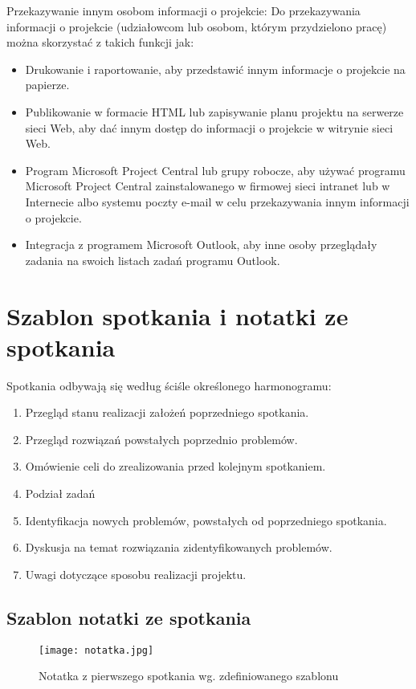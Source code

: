 \clearpage

Przekazywanie innym osobom informacji o projekcie:
 Do przekazywania informacji o projekcie (udziałowcom lub osobom, którym przydzielono pracę) można skorzystać z takich funkcji jak:
\begin{itemize}
\item Drukowanie i raportowanie, aby przedstawić innym informacje o projekcie na papierze. 
\item Publikowanie w formacie HTML lub zapisywanie planu projektu na serwerze sieci Web, aby dać innym dostęp do informacji o projekcie w witrynie sieci Web. 
\item Program Microsoft Project Central lub grupy robocze, aby używać programu Microsoft Project Central zainstalowanego w firmowej sieci intranet lub w Internecie albo systemu poczty e-mail w celu przekazywania innym informacji o projekcie. 
\item Integracja z programem Microsoft Outlook, aby inne osoby przeglądały zadania na swoich listach zadań programu Outlook.
\end{itemize}



\section{Szablon spotkania i notatki ze spotkania}


Spotkania odbywają się według ściśle określonego harmonogramu:
\begin{enumerate}
	\item Przegląd stanu realizacji założeń poprzedniego spotkania.
	\item Przegląd rozwiązań powstałych poprzednio problemów.
	\item Omówienie celi do zrealizowania przed kolejnym spotkaniem.
	\item Podział zadań
	\item Identyfikacja nowych problemów, powstałych od poprzedniego spotkania.
	\item Dyskusja na temat rozwiązania zidentyfikowanych problemów.
	\item Uwagi dotyczące sposobu realizacji projektu.
\end{enumerate}

\subsection*{Szablon notatki ze spotkania}

\begin{figure}[!h]
\centering
\texttt{[image: notatka.jpg]}
\caption{Notatka z pierwszego spotkania wg. zdefiniowanego szablonu}
\label{fig:notatka}
\end{figure}

